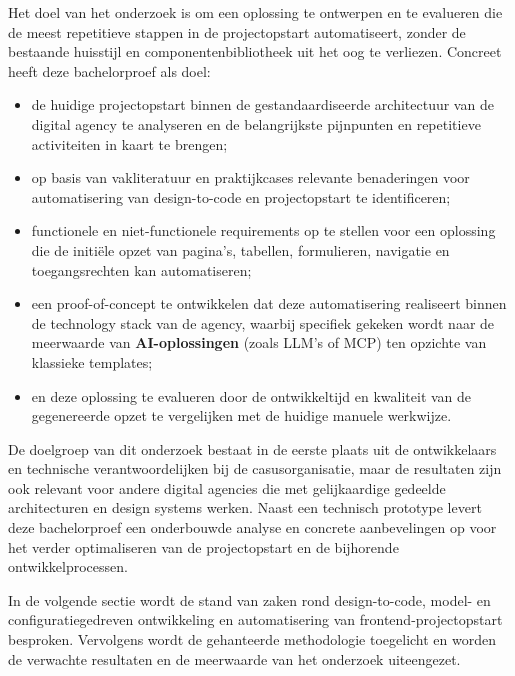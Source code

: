 Het doel van het onderzoek is om een oplossing te ontwerpen en te evalueren die de meest repetitieve stappen in de projectopstart automatiseert, zonder de bestaande huisstijl en componentenbibliotheek uit het oog te verliezen. Concreet heeft deze bachelorproef als doel:
\begin{itemize}
  \item de huidige projectopstart binnen de gestandaardiseerde architectuur van de digital agency te analyseren en de belangrijkste pijnpunten en repetitieve activiteiten in kaart te brengen;
  \item op basis van vakliteratuur en praktijkcases relevante benaderingen voor automatisering van design-to-code en projectopstart te identificeren;
  \item functionele en niet-functionele requirements op te stellen voor een oplossing die de initiële opzet van pagina's, tabellen, formulieren, navigatie en toegangsrechten kan automatiseren;
  \item een proof-of-concept te ontwikkelen dat deze automatisering realiseert binnen de technology stack van de agency, waarbij specifiek gekeken wordt naar de meerwaarde van \textbf{AI-oplossingen} (zoals LLM's of MCP) ten opzichte van klassieke templates;
  \item en deze oplossing te evalueren door de ontwikkeltijd en kwaliteit van de gegenereerde opzet te vergelijken met de huidige manuele werkwijze.
\end{itemize}

De doelgroep van dit onderzoek bestaat in de eerste plaats uit de ontwikkelaars en technische verantwoordelijken bij de casusorganisatie, maar de resultaten zijn ook relevant voor andere digital agencies die met gelijkaardige gedeelde architecturen en design systems werken. Naast een technisch prototype levert deze bachelorproef een onderbouwde analyse en concrete aanbevelingen op voor het verder optimaliseren van de projectopstart en de bijhorende ontwikkelprocessen.

In de volgende sectie wordt de stand van zaken rond design-to-code, model- en configuratiegedreven ontwikkeling en automatisering van frontend-projectopstart besproken. Vervolgens wordt de gehanteerde methodologie toegelicht en worden de verwachte resultaten en de meerwaarde van het onderzoek uiteengezet.
